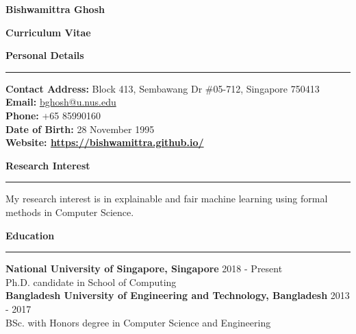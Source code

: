 \documentclass[a4paper,11pt,final]{article}
\newcommand{\Sep}{\vspace{1.5em}}
\newcommand{\SmallSep}{\vspace{0.5em}}
\begin{document}
	
	\begin{center}
		\Huge \textbf{Bishwamittra Ghosh}\\
		\vspace{0.2em}	
		\Large \centerline{ \textbf{Curriculum Vitae}}
	\end{center}
	
	\Sep
	\Large { \textbf{Personal Details}}\\
	\noindent\rule{\textwidth}{1pt}
	\normalsize 
	 \textbf{Contact Address:} Block 413, Sembawang Dr \#05-712, Singapore 750413\\
	\textbf{Email:} \url{bghosh@u.nus.edu}  \\
	\textbf{Phone:} +65 85990160\\
	\textbf{Date of Birth:}  28  November  1995 \\
	\textbf{Website: \url{https://bishwamittra.github.io/}} 

	\Sep	
\Large { \textbf{Research Interest}}\\
\noindent\rule{\textwidth}{1pt}
\normalsize
My research interest is in explainable and fair machine learning using formal methods in Computer Science. 
	
	\Sep	
\Large { \textbf{Education}}\\
\noindent\rule{\textwidth}{1pt}
\normalsize
\textbf{National University of Singapore, Singapore}
\hspace*{\fill} 2018  - Present\\
Ph.D. candidate in  School of Computing\\

\SmallSep
\textbf{Bangladesh University of Engineering and Technology, Bangladesh}
\hspace*{\fill} 2013  -  2017\\
BSc. with Honors degree in Computer Science and Engineering\\
\end{document}

